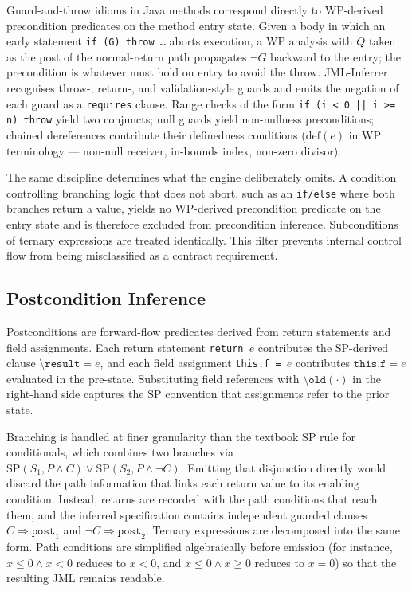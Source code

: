 \documentclass[11pt]{article}
\begin{document}
Guard-and-throw idioms in Java methods correspond directly to WP-derived precondition predicates on the method entry state. Given a body in which an early statement \texttt{if (G) throw \dots} aborts execution, a WP analysis with $Q$ taken as the post of the normal-return path propagates $\neg G$ backward to the entry; the precondition is whatever must hold on entry to avoid the throw. JML-Inferrer recognises throw-, return-, and validation-style guards and emits the negation of each guard as a \texttt{requires} clause. Range checks of the form \texttt{if (i < 0 || i >= n) throw} yield two conjuncts; null guards yield non-nullness preconditions; chained dereferences contribute their definedness conditions ($\text{def}(e)$ in WP terminology --- non-null receiver, in-bounds index, non-zero divisor).

The same discipline determines what the engine deliberately omits. A condition controlling branching logic that does not abort, such as an \texttt{if/else} where both branches return a value, yields no WP-derived precondition predicate on the entry state and is therefore excluded from precondition inference. Subconditions of ternary expressions are treated identically. This filter prevents internal control flow from being misclassified as a contract requirement.

\subsection{Postcondition Inference}
\label{subsec:sp-mapping}

Postconditions are forward-flow predicates derived from return statements and field assignments. Each return statement \texttt{return $e$} contributes the SP-derived clause $\texttt{\textbackslash result} = e$, and each field assignment \texttt{this.f = $e$} contributes $\texttt{this.f} = e$ evaluated in the pre-state. Substituting field references with $\texttt{\textbackslash old}(\cdot)$ in the right-hand side captures the SP convention that assignments refer to the prior state.

Branching is handled at finer granularity than the textbook SP rule for conditionals, which combines two branches via $\text{SP}(S_1, P \land C) \lor \text{SP}(S_2, P \land \neg C)$. Emitting that disjunction directly would discard the path information that links each return value to its enabling condition. Instead, returns are recorded with the path conditions that reach them, and the inferred specification contains independent guarded clauses $C \Rightarrow \texttt{post}_1$ and $\neg C \Rightarrow \texttt{post}_2$. Ternary expressions are decomposed into the same form. Path conditions are simplified algebraically before emission (for instance, $x \le 0 \land x < 0$ reduces to $x < 0$, and $x \le 0 \land x \ge 0$ reduces to $x = 0$) so that the resulting JML remains readable.
\end{document}
